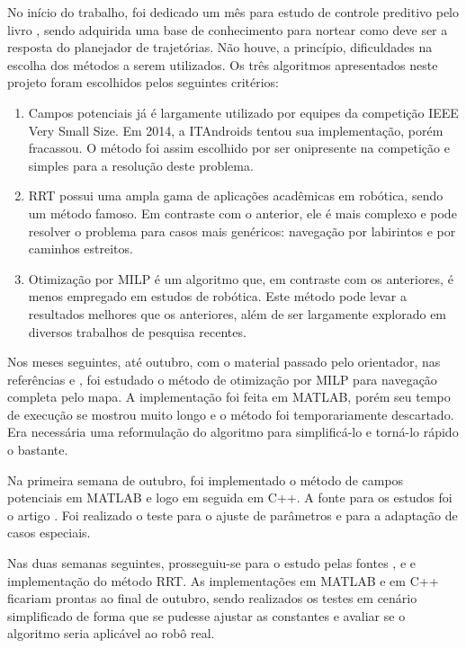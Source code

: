 \documentclass[a4paper,12pt]{article}
\begin{document}
No início do trabalho, foi dedicado um mês para estudo de controle preditivo pelo livro \cite{maciejowski2002}, sendo adquirida uma base de conhecimento para nortear como deve ser a resposta do planejador de trajetórias. Não houve, a princípio, dificuldades na escolha dos métodos a serem utilizados. Os três algoritmos apresentados neste projeto foram escolhidos pelos seguintes critérios:

\begin{enumerate}
\item Campos potenciais já é largamente utilizado por equipes da competição IEEE Very Small Size. Em 2014, a ITAndroids tentou sua implementação, porém fracassou. O método foi assim escolhido por ser onipresente na competição e simples para a resolução deste problema.
\item RRT possui uma ampla gama de aplicações acadêmicas em robótica, sendo um método famoso. Em contraste com o anterior, ele é mais complexo e pode resolver o problema para casos mais genéricos: navegação por labirintos e por caminhos estreitos.
\item Otimização por MILP é um algoritmo que, em contraste com os anteriores, é menos empregado em estudos de robótica. Este método pode levar a resultados melhores que os anteriores, além de ser largamente explorado em diversos trabalhos de pesquisa recentes.
\end{enumerate}

Nos meses seguintes, até outubro, com o material passado pelo orientador, nas referências \cite{bellingham2002} e \cite{rubens2015}, foi estudado o método de otimização por MILP para navegação completa pelo mapa. A implementação foi feita em MATLAB, porém seu tempo de execução se mostrou muito longo e o método foi temporariamente descartado. Era necessária uma reformulação do algoritmo para simplificá-lo e torná-lo rápido o bastante.

Na primeira semana de outubro, foi implementado o método de campos potenciais em MATLAB e logo em seguida em C++. A fonte para os estudos foi o artigo \cite{khatib1986}. Foi realizado o teste para o ajuste de parâmetros e para a adaptação de casos especiais.

Nas duas semanas seguintes, prosseguiu-se para o estudo pelas fontes \cite{lavalle2011}, \cite{rubens2009} e \cite{howiechoset} e implementação do método RRT. As implementações em MATLAB e em C++ ficariam prontas ao final de outubro, sendo realizados os testes em cenário simplificado de forma que se pudesse ajustar as constantes e avaliar se o algoritmo seria aplicável ao robô real.
\end{document}
